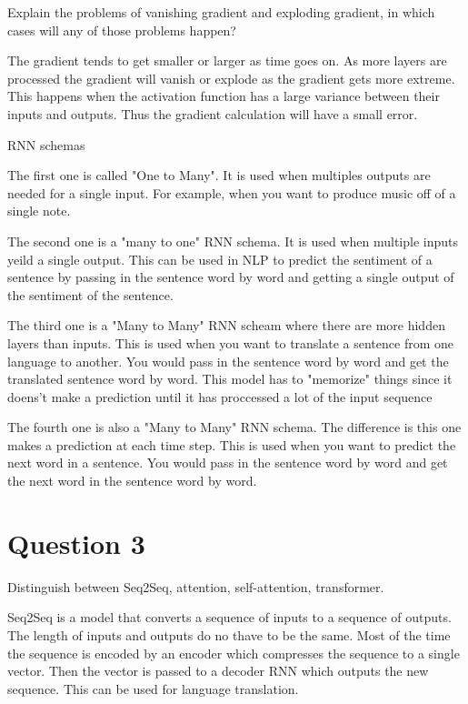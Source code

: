 \documentclass{article}
\begin{document}
Explain the problems of vanishing gradient and exploding gradient, in which cases will any of those problems happen?

The gradient tends to get smaller or larger as time goes on. As more layers are processed the gradient will vanish or explode as the gradient gets more extreme. This happens when the activation function has a large variance between their inputs and outputs. Thus the gradient calculation will have a small error. 



RNN schemas

The first one is called "One to Many". It is used when multiples outputs are needed for a single input. For example, when you want to produce music off of a single note.  

The second one is a "many to one" RNN schema. It is used when multiple inputs yeild a single output. This can be used in NLP to predict the sentiment of a sentence by passing in the sentence word by word and getting a single output of the sentiment of the sentence.

The third one is a "Many to Many" RNN scheam where there are more hidden layers than inputs. This is used when you want to translate a sentence from one language to another. You would pass in the sentence word by word and get the translated sentence word by word. This model has to "memorize" things since it doens't make a prediction until it has proccessed a lot of the input sequence

The fourth one is also a "Many to Many" RNN schema. The difference is this one makes a prediction at each time step. This is used when you want to predict the next word in a sentence. You would pass in the sentence word by word and get the next word in the sentence word by word.

\section{Question 3}

Distinguish between Seq2Seq, attention, self-attention, transformer.

Seq2Seq is a model that converts a sequence of inputs to a sequence of outputs. The length of inputs and outputs do no thave to be the same. Most of the time the sequence is encoded by an encoder which compresses the sequence to a single vector. Then the vector is passed to a decoder RNN which outputs the new sequence. This can be used for language translation. 
\end{document}
